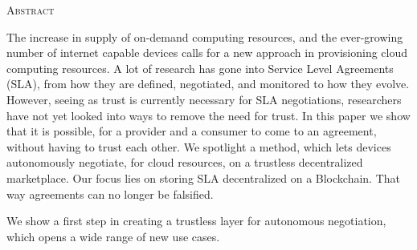 \begin{center}
  \textsc{Abstract}
\end{center}
%
\noindent
%


The increase in supply of on-demand computing resources, and the ever-growing number of internet capable devices calls for a new approach in provisioning cloud computing resources. A lot of research has gone into Service Level Agreements (SLA), from how they are defined, negotiated, and monitored to how they evolve. However, seeing as trust is currently necessary for SLA negotiations, researchers have not yet looked into ways to remove the need for trust. In this paper we show that it is possible, for a provider and a consumer to come to an agreement, without having to trust each other. We spotlight a method, which lets devices autonomously negotiate, for cloud resources, on a trustless decentralized marketplace. Our focus lies on storing SLA decentralized on a Blockchain. That way agreements can no longer be falsified. 


We show a first step in creating a trustless layer for autonomous negotiation, which opens a wide range of new use cases.



